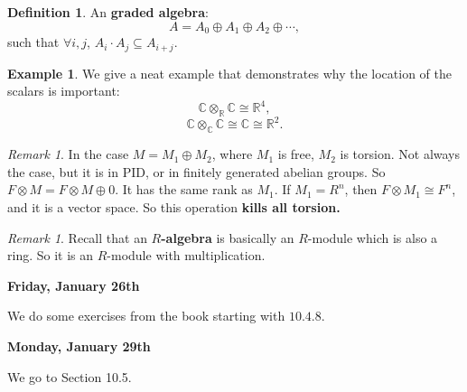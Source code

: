 \documentclass[12pt]{amsbook}
\theoremstyle{plain}
\numberwithin{section}{chapter}
\numberwithin{equation}{chapter}
\theoremstyle{definition}
\newtheorem{Def}[theorem]{Definition}
\newtheorem{Ex}[theorem]{Example}
\theoremstyle{remark}
\newtheorem{rem}[theorem]{Remark}
\newcommand{\sub}{\subseteq}
\newcommand{\R}{\mathbb{R}}
\renewcommand{\c}{\mathbb{C}}
\newcommand{\tens}{\otimes}
\begin{document}
\begin{Def}
An \textbf{graded algebra}: 
$$
A = A_0 \oplus A_1 \oplus A_2 \oplus \cdots,
$$
such that $\forall i,j$, $A_i\cdot A_j \sub A_{i + j}$. 
\end{Def}




\begin{Ex}
We give a neat example that demonstrates why the location of the scalars is important: 
$$
\c \tens_\R \c \cong \R^4,
$$
$$
\c \tens_\c \c \cong \c \cong \R^2.
$$
\end{Ex}

\begin{rem}
In the case $M = M_1 \oplus M_2$, where $M_1$ is free, $M_2$ is torsion. Not always the case, but it is in PID, or in finitely generated abelian groups. So $F \tens M = F \tens M \oplus 0$. It has the same rank as $M_1$. If $M_1 = R^n$, then $F \tens M_1 \cong F^n$, and it is a vector space. So this operation \textbf{kills all torsion.}
\end{rem}

\begin{rem}
Recall that an \textbf{$R$-algebra} is basically an $R$-module which is also a ring. So it is an $R$-module with multiplication. 
\end{rem}

\textbf{Friday, January 26th}

We do some exercises from the book starting with $10.4.8$. 

\textbf{Monday, January 29th}

We go to Section 10.5.
\end{document}
